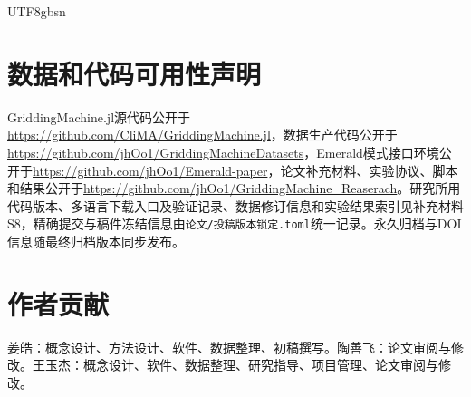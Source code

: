\documentclass[numdoi]{chinese}
\begin{document}
\begin{CJK}{UTF8}{gbsn}
\section*{数据和代码可用性声明}
GriddingMachine.jl源代码公开于\url{https://github.com/CliMA/GriddingMachine.jl}，数据生产代码公开于\url{https://github.com/jhOo1/GriddingMachineDatasets}，Emerald模式接口环境公开于\url{https://github.com/jhOo1/Emerald-paper}，论文补充材料、实验协议、脚本和结果公开于\url{https://github.com/jhOo1/GriddingMachine_Reaserach}。研究所用代码版本、多语言下载入口及验证记录、数据修订信息和实验结果索引见补充材料S8，精确提交与稿件冻结信息由\texttt{论文/投稿版本锁定.toml}统一记录。永久归档与DOI信息随最终归档版本同步发布。

\section*{作者贡献}
姜皓：概念设计、方法设计、软件、数据整理、初稿撰写。陶善飞：论文审阅与修改。王玉杰：概念设计、软件、数据整理、研究指导、项目管理、论文审阅与修改。


\end{CJK}
\end{document}
